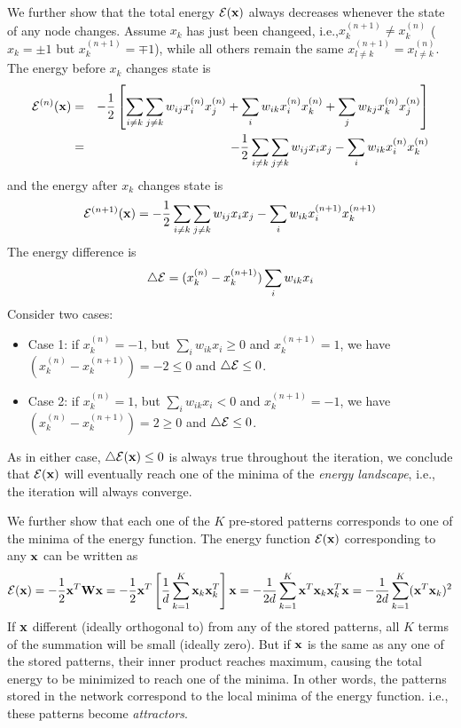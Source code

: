 \documentclass{article}
\begin{document}
We further show that the total energy ${\cal E}({\bf x})$ always decreases 
whenever the state of any node changes. Assume $x_k$ has just been changeed,
i.e.,$x_k^{(n+1)} \neq x_k^{(n)}$ ($x_k=\pm 1$ but $x_k^{(n+1)}=\mp 1$), while
all others remain the same $x_{l \neq k}^{(n+1)}=x_{l \neq k}^{(n)}$. The
energy before $x_k$ changes state is
\begin{eqnarray}
  {\cal E}^{(n)}({\bf x})&=&-\frac{1}{2}
  \left[ \sum_{i\neq k}\sum_{j\neq k}w_{ij}x_i^{(n)}x_j^{(n)}
    +\sum_i w_{ik}x_i^{(n)}x_k^{(n)}+\sum_j w_{kj}x_k^{(n)}x_j^{(n)} \right]
  \nonumber\\
  &=& -\frac{1}{2} \sum_{i\neq k}\sum_{j\neq k}w_{ij}x_ix_j
  - \sum_i w_{ik}x_i^{(n)}x_k^{(n)} 
  \nonumber
\end{eqnarray}
and the energy after $x_k$ changes state is
\begin{equation}
  {\cal E}^{(n+1)}({\bf x})= -\frac{1}{2} \sum_{i\neq k}\sum_{j\neq k}w_{ij}x_ix_j
  - \sum_i w_{ik}x_i^{(n+1)}x^{(n+1)}_k 
\end{equation}
The energy difference is
\begin{equation}
  \bigtriangleup {\cal E}=(x_k^{(n)}-x_k^{(n+1)}) \sum_i w_{ik}x_i
\end{equation}
Consider two cases:
\begin{itemize}
\item Case 1:  if $x_k^{(n)}=-1$, but $\sum_i w_{ik}x_i \geq 0$ and 
  $x_k^{(n+1)}=1$, we have $(x_k^{(n)}-x_k^{(n+1)})=-2 \le 0$ and 
  $\bigtriangleup {\cal E} \leq 0$.
\item Case 2: if $x_k^{(n)}=1$, but $\sum_i w_{ik}x_i < 0$ and 
  $x_k^{(n+1)}=-1$, we have $(x_k^{(n)}-x_k^{(n+1)})=2 \ge 0$ and 
  $\bigtriangleup {\cal E} \leq 0$.
\end{itemize}
As in either case, $\bigtriangleup {\cal E}({\bf x}) \leq 0$ is always 
true throughout the iteration, we conclude that ${\cal E}({\bf x})$ will 
eventually reach one of the minima of the {\em energy landscape}, i.e., 
the iteration will always converge.


We further show that each one of the $K$ pre-stored patterns corresponds
to one of the minima of the energy function. The energy function 
${\cal E}({\bf x})$ corresponding to any ${\bf x}$ can be written as
\begin{equation}
  {\cal E}({\bf x}) = -\frac{1}{2}{\bf x}^T{\bf Wx}
  =-\frac{1}{2}{\bf x}^T\left[\frac{1}{d}\sum_{k=1}^K {\bf x}_k{\bf x}_k^T\right]{\bf x}
  =-\frac{1}{2d}\sum_{k=1}^K {\bf x}^T{\bf x}_k{\bf x}_k^T{\bf x}  
  =-\frac{1}{2d}\sum_{k=1}^K ({\bf x}^T{\bf x}_k)^2
\end{equation}
If ${\bf x}$ different (ideally orthogonal to) from any of the stored 
patterns, all $K$ terms of the summation will be small (ideally zero). 
But if ${\bf x}$ is the same as any one of the stored patterns, their 
inner product reaches maximum, causing the total energy to be minimized 
to reach one of the minima. In other words, the patterns stored in the 
network correspond to the local minima of the energy function. i.e., 
these patterns become {\em attractors}. 
\end{document}
